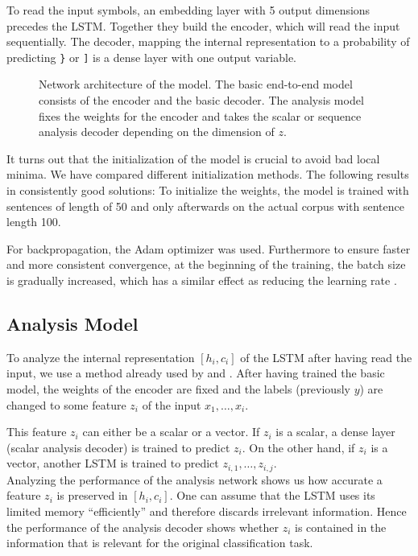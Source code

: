 \documentclass[11pt,a4paper]{article}
\begin{document}
To read the input symbols, an embedding layer with 5 output dimensions precedes the LSTM. Together they build the encoder, which will read the input sequentially. The decoder, mapping the internal representation to a probability of predicting \verb|}| or \verb|]| is a dense layer with one output variable.

\begin{figure*}[ht]
    \centering
    
    \caption{Network architecture of the model. The basic end-to-end model consists of the encoder and the basic decoder. The analysis model fixes the weights for the encoder and takes the scalar or sequence analysis decoder depending on the dimension of $z$.}
    \label{fig:lstm_architecture}
\end{figure*}

It turns out that the initialization of the model is crucial to avoid bad local minima. We have compared different initialization methods. The following results in consistently good solutions: To initialize the weights, the model is trained with sentences of length of 50 and only afterwards on the actual corpus with sentence length 100.

For backpropagation, the Adam \cite{kingma2014adam} optimizer was used. Furthermore to ensure faster and more consistent convergence, at the beginning of the training, the batch size is gradually increased, which has a similar effect as reducing the learning rate \cite{smith2017don}.

\subsection{Analysis Model}

To analyze the internal representation $[h_i, c_i]$ of the LSTM after having read the input, we use a method already used by \citeauthor{shi2016does}  and \citeauthor{belinkov2017neural} . After having trained the basic model, the weights of the encoder are fixed and the labels (previously $y$) are changed to some feature $z_i$ of the input $x_1,\ldots, x_i$.

This feature $z_i$ can either be a scalar or a vector. If $z_i$ is a scalar, a dense layer (scalar analysis decoder) is trained to predict $z_i$. On the other hand, if $z_i$ is a vector, another LSTM is trained to predict $z_{i,1},\ldots,z_{i,j}$.\\

Analyzing the performance of the analysis network shows us how accurate a feature $z_i$ is preserved in $[h_i, c_i]$. One can assume that the LSTM uses its limited memory ``efficiently'' and therefore discards irrelevant information. Hence the performance of the analysis decoder shows whether $z_i$ is contained in the information that is relevant for the original classification task.
\end{document}
